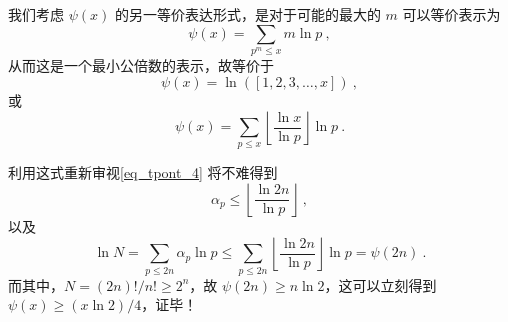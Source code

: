 我们考虑 $\psi(x)$ 的另一等价表达形式，是对于可能的最大的 $m$ 可以等价表示为
\begin{equation}
\psi(x) = \sum_{p^m \le x} m \ln p ~,
\end{equation}
从而这是一个最小公倍数的表示，故等价于
\begin{equation}
\psi(x) = \ln\left( [1, 2, 3, \dots, x] \right)~,
\end{equation}
或
\begin{equation}
\psi(x) = \sum_{p \le x} \left\lfloor \frac{\ln x}{\ln p} \right\rfloor \ln p ~.
\end{equation}

利用这式重新审视\autoref{eq_tpont_4} 将不难得到
\begin{equation}
\alpha_p \le \left \lfloor \frac{\ln 2n}{\ln p} \right \rfloor ~,
\end{equation}
以及
\begin{equation}
\ln N = \sum_{p \le 2n} \alpha_p \ln p \le \sum_{p \le 2n} \left\lfloor \frac{\ln 2n}{\ln p}  \right \rfloor \ln p= \psi(2n) ~.
\end{equation}
而其中，$N = (2n)!/n! \ge 2^n$，故 $\psi(2n) \ge n \ln 2$，这可以立刻得到 $\psi(x) \ge (x \ln 2)/4$，证毕！




